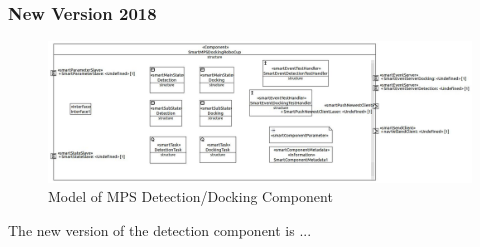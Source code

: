 \subsubsection{ New Version 2018}

\begin{figure}[h]
\centering
\includegraphics[scale=0.4]{pic/SmartMPSDockingRoboCup.JPG}
\caption{Model of MPS Detection/Docking Component}
\label{fig:dockingold_overview}
\end{figure}

The new version of the detection component is ...

